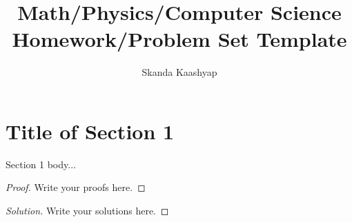 \documentclass[10pt]{extreport}
\title{Math/Physics/Computer Science Homework/Problem Set Template}
\author{Skanda Kaashyap}
\newenvironment{solution}
  {\renewcommand\qedsymbol{$\blacksquare$}\begin{proof}[Solution]}
  {\end{proof}}
\begin{document}
\maketitle

\section*{Title of Section 1}
	Section 1 body...
	\begin{proof}
		Write your proofs here.
	\end{proof}
	
	\begin{solution}
		Write your solutions here.
	\end{solution}
\end{document}
